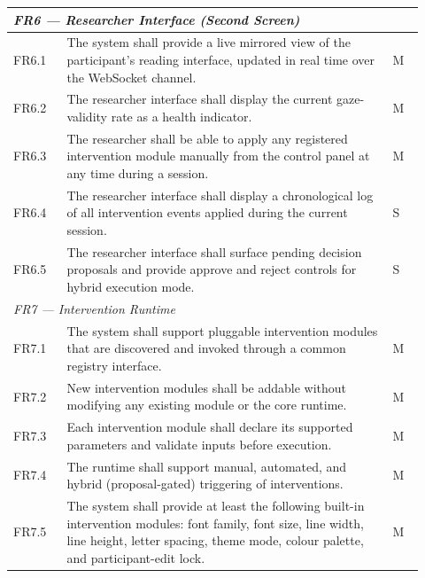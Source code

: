 \begin{longtable}{%
  p{0.12\linewidth}
  p{0.73\linewidth}
  p{0.07\linewidth}
}
\multicolumn{3}{l}{\textit{FR6 — Researcher Interface (Second Screen)}} \\
\midrule
FR6.1 & The system shall provide a live mirrored view of the participant's
        reading interface, updated in real time over the WebSocket channel. & M \\
FR6.2 & The researcher interface shall display the current gaze-validity
        rate as a health indicator. & M \\
FR6.3 & The researcher shall be able to apply any registered intervention
        module manually from the control panel at any time during a
        session. & M \\
FR6.4 & The researcher interface shall display a chronological log of all
        intervention events applied during the current session. & S \\
FR6.5 & The researcher interface shall surface pending decision proposals
        and provide approve and reject controls for hybrid execution mode. & S \\
\midrule

\multicolumn{3}{l}{\textit{FR7 — Intervention Runtime}} \\
\midrule
FR7.1 & The system shall support pluggable intervention modules that are
        discovered and invoked through a common registry interface. & M \\
FR7.2 & New intervention modules shall be addable without modifying any
        existing module or the core runtime. & M \\
FR7.3 & Each intervention module shall declare its supported parameters
        and validate inputs before execution. & M \\
FR7.4 & The runtime shall support manual, automated, and hybrid (proposal-gated)
        triggering of interventions. & M \\
FR7.5 & The system shall provide at least the following built-in intervention
        modules: font family, font size, line width, line height, letter spacing,
        theme mode, colour palette, and participant-edit lock. & M \\
\midrule


\end{longtable}
